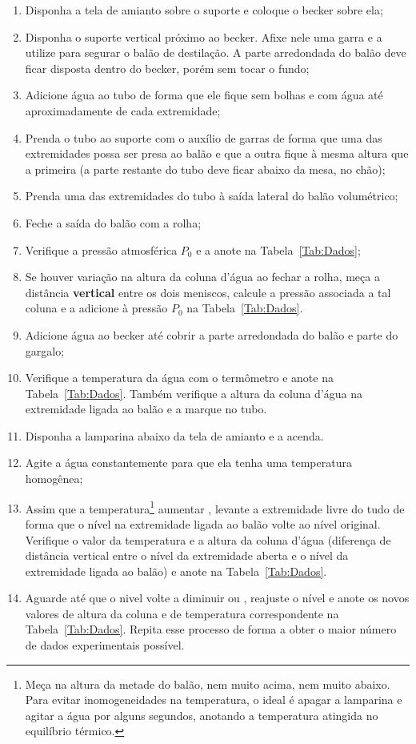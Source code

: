 \begin{enumerate}
\item Disponha a tela de amianto sobre o suporte e coloque o becker sobre ela;
\item Disponha o suporte vertical próximo ao becker. Afixe nele uma garra e a utilize para segurar o balão de destilação. A parte arredondada do balão deve ficar disposta dentro do becker, porém sem tocar o fundo;
\item Adicione água ao tubo de forma que ele fique sem bolhas e com água até aproximadamente  de cada extremidade;
\item Prenda o tubo ao suporte com o auxílio de garras de forma que uma das extremidades possa ser presa ao balão e que a outra fique à mesma altura que a primeira (a parte restante do tubo deve ficar abaixo da mesa, no chão);
\item Prenda uma das extremidades do tubo à saída lateral do balão volumétrico;
\item Feche a saída do balão com a rolha;
\item Verifique a pressão atmosférica $P_0$ e a anote na Tabela~\ref{Tab:Dados};
\item Se houver variação na altura da coluna d'água ao fechar a rolha, meça a distância \textbf{vertical} entre os dois meniscos, calcule a pressão associada a tal coluna e a adicione à pressão $P_0$ na Tabela~\ref{Tab:Dados}.
\item Adicione água ao becker até cobrir a parte arredondada do balão e parte do gargalo;
\item Verifique a temperatura da água com o termômetro e anote na Tabela~\ref{Tab:Dados}. Também verifique a altura da coluna d'água na extremidade ligada ao balão e a marque no tubo.
\item Disponha a lamparina abaixo da tela de amianto e a acenda.
\item Agite a água constantemente para que ela tenha uma temperatura homogênea; 
\item Assim que a temperatura\footnote{Meça na altura da metade do balão, nem muito acima, nem muito abaixo. Para evitar inomogeneidades na temperatura, o ideal é apagar a lamparina e agitar a água por alguns segundos, anotando a temperatura atingida no equilíbrio térmico.} aumentar  , levante a extremidade livre do tudo de forma que o nível na extremidade ligada ao balão volte ao nível original. Verifique o valor da temperatura e a altura da coluna d'água (diferença de distância vertical entre o nível da extremidade aberta e o nível da extremidade ligada ao balão) e anote na Tabela~\ref{Tab:Dados}.
\item Aguarde até que o nivel volte a diminuir  ou , reajuste o nível e anote os novos valores de altura da coluna e de temperatura correspondente na Tabela~\ref{Tab:Dados}. Repita esse processo de forma a obter o maior número de dados experimentais possível.
\end{enumerate}

